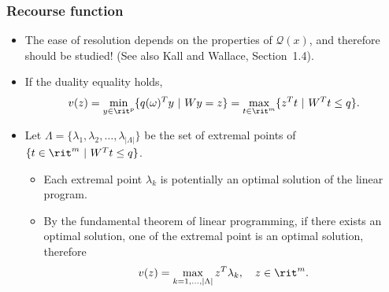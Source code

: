 \begin{frame}
	\frametitle{Recourse function}
	
	\begin{itemize}
		\item
		The ease of resolution depends on the properties of $\mathcal{Q}(x)$, and therefore should be studied! (See also Kall and Wallace, Section~1.4).
		\item
		If the duality equality holds,
		\[
		v(z) = \min_{y \in \rit^p} \lbrace q(\omega)^Ty \ |\ Wy = z \rbrace
		= \max_{t \in \rit^m} \lbrace z^Tt \ |\ W^Tt \leq q \rbrace.
		\]
		\item
		Let $\Lambda = \lbrace \lambda_1, \lambda_2, \ldots,
		\lambda_{|\Lambda|}\rbrace$ be the set of extremal points of $\lbrace t \in \rit^m \ |\ W^Tt \leq q\rbrace$.
		\begin{itemize}
			\item
			Each extremal point $\lambda_k$ is potentially an optimal solution of the linear program.
			\item
			By the fundamental theorem of linear programming, if there exists an optimal solution, one of the extremal point is an optimal solution, therefore
			\[
			v(z) = \max_{k=1,\ldots,|\Lambda|} z^T\lambda_k,\quad z \in \rit^m.
			\]
		\end{itemize}
	\end{itemize}
\end{frame}
